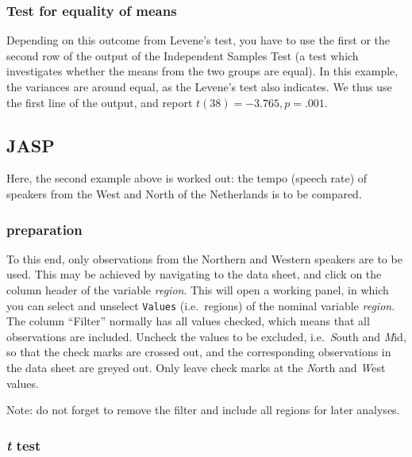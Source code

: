\documentclass[
]{book}
\begin{document}
\hypertarget{test-for-equality-of-means}{%
\subsubsection{Test for equality of means}\label{test-for-equality-of-means}}

Depending on this outcome from Levene's test, you have to use the first
or the second row of the output of the Independent Samples Test
(a test which investigates whether the means from the two groups are equal).
In this example, the variances are around equal, as the
Levene's test also indicates. We thus use the first line of the output,
and report \(t(38)=-3.765, p=.001\).

\hypertarget{sec:JASP-ttest-unpaired}{%
\subsection{JASP}\label{sec:JASP-ttest-unpaired}}

Here, the second example above is worked out: the tempo (speech rate) of speakers from the West and North of the Netherlands is to be compared.

\hypertarget{preparation}{%
\subsubsection{preparation}\label{preparation}}

To this end, only observations from the Northern and Western speakers are to be used. This may be achieved by navigating to the data sheet, and click on the column header of the variable \emph{region}. This will open a working panel, in which you can select and unselect \texttt{Values} (i.e.~regions) of the nominal variable \emph{region}. The column ``Filter'' normally has all values checked, which means that all observations are included. Uncheck the values to be excluded, i.e.~\emph{S}outh and \emph{M}id, so that the check marks are crossed out, and the corresponding observations in the data sheet are greyed out. Only leave check marks at the \emph{N}orth and \emph{W}est values.

Note: do not forget to remove the filter and include all regions for later analyses.

\hypertarget{t-test}{%
\subsubsection{\texorpdfstring{\emph{t} test}{t test}}\label{t-test}}
\end{document}
